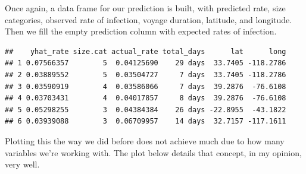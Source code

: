 \documentclass[
  11,
]{book}
\newenvironment{Shaded}{\begin{snugshade}}{\end{snugshade}}
\newcommand{\AttributeTok}[1]{\textcolor[rgb]{0.27,0.27,0.27}{#1}}
\newcommand{\ConstantTok}[1]{\textcolor[rgb]{0.37,0.37,0.37}{#1}}
\newcommand{\DecValTok}[1]{\textcolor[rgb]{0.06,0.06,0.06}{#1}}
\newcommand{\FunctionTok}[1]{\textcolor[rgb]{0.27,0.27,0.27}{\textbf{#1}}}
\newcommand{\NormalTok}[1]{#1}
\newcommand{\OtherTok}[1]{\textcolor[rgb]{0.37,0.37,0.37}{#1}}
\newcommand{\SpecialCharTok}[1]{\textcolor[rgb]{0.43,0.43,0.43}{\textbf{#1}}}
\begin{document}
Once again, a data frame for our prediction is built, with predicted rate, size categories, observed rate of infection, voyage duration, latitude, and longitude. Then we fill the empty prediction column with expected rates of infection.

\begin{Shaded}
\end{Shaded}

\begin{verbatim}
##    yhat_rate size.cat actual_rate total_days      lat      long
## 1 0.07566357        5  0.04125690    29 days  33.7405 -118.2786
## 2 0.03889552        5  0.03504727     7 days  33.7405 -118.2786
## 3 0.03590919        4  0.03586066     7 days  39.2876  -76.6108
## 4 0.03703431        4  0.04017857     8 days  39.2876  -76.6108
## 5 0.05298255        3  0.04384384    26 days -22.8955  -43.1822
## 6 0.03939088        3  0.06709957    14 days  32.7157 -117.1611
\end{verbatim}

Plotting this the way we did before does not achieve much due to how many variables we're working with. The plot below details that concept, in my opinion, very well.
\end{document}
